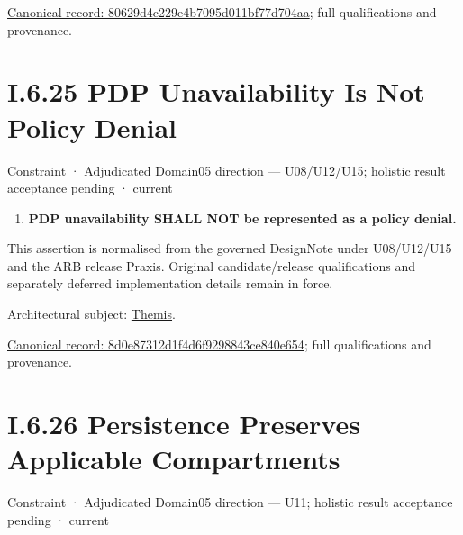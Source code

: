{\footnotesize \href{../../../../../../../continuum/motivation/constraint/80629d4c229e4b7095d011bf77d704aa.md}{Canonical record: 80629d4c229e4b7095d011bf77d704aa}; full qualifications and provenance.}\par
\section*{I.6.25 PDP Unavailability Is Not Policy Denial}
\label{navigation:I.6.25}

\label{element:8d0e87312d1f4d6f9298843ce840e654}
{\small Constraint · Adjudicated Domain05 direction — U08/U12/U15; holistic result acceptance pending · current}\par

\begin{enumerate}


\item \textbf{PDP unavailability SHALL NOT be represented as a policy denial.}

\end{enumerate}


This assertion is normalised from the governed DesignNote under U08/U12/U15 and the ARB release Praxis. Original candidate/release qualifications and separately deferred implementation details remain in force.



Architectural subject: \hyperref[element:899d34ec491948b68aad09e507dea6d1]{Themis}.


{\footnotesize \href{../../../../../../../continuum/motivation/constraint/8d0e87312d1f4d6f9298843ce840e654.md}{Canonical record: 8d0e87312d1f4d6f9298843ce840e654}; full qualifications and provenance.}\par
\section*{I.6.26 Persistence Preserves Applicable Compartments}
\label{navigation:I.6.26}

\label{element:6e963678cf6f4c3488c798d6afc3b910}
{\small Constraint · Adjudicated Domain05 direction — U11; holistic result acceptance pending · current}\par

